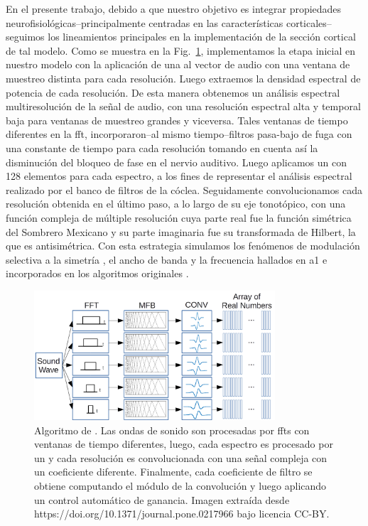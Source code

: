 {En el presente trabajo, debido a que nuestro objetivo es integrar propiedades neurofisiológicas--principalmente centradas en las características corticales--seguimos
los lineamientos principales en la implementación de la sección cortical de tal modelo.
Como se muestra en la Fig.~\ref{fig:MRSTSA}, implementamos la etapa inicial en nuestro modelo con la aplicación de una  al vector de audio
con una ventana de muestreo distinta para cada resolución.
Luego extraemos la densidad espectral de potencia de cada resolución.
De esta manera obtenemos un análisis espectral multiresolución de la señal de audio,
con una resolución espectral alta y temporal baja para ventanas de muestreo grandes y
viceversa.
Tales ventanas de tiempo diferentes en la \gls{fft},
incorporaron--al mismo tiempo--filtros pasa-bajo de fuga con una constante de tiempo para cada
resolución tomando en cuenta así la disminución del bloqueo de fase en el nervio auditivo. 
Luego aplicamos un  con 128 elementos para cada espectro,
a los fines de representar el análisis espectral realizado por el banco de filtros de la cóclea.
Seguidamente convolucionamos cada resolución obtenida en el último paso, a lo largo de su eje tonotópico,
con una función compleja de múltiple resolución cuya parte real
fue la función simétrica del Sombrero Mexicano y su parte imaginaria fue su transformada de Hilbert, la que es antisimétrica.
Con esta estrategia simulamos los fenómenos de modulación selectiva a la simetría \cite{shamma_1993}, el ancho de banda \cite{schreiner_1990}
y la frecuencia \cite{shamma_1993,heil_1992,mendelson_1985}
hallados en \gls{a1} e incorporados en los algoritmos originales \cite{wang_1995}.

\begin{figure}[h!]
    \centering
    \includegraphics[width=0.8\textwidth]{MRSTSA.png}
    \caption{Algoritmo de . Las ondas de sonido son procesadas por \glspl{fft} con ventanas de tiempo diferentes, luego, cada espectro es procesado por
	    un  y cada resolución es convolucionada con una señal compleja con un coeficiente diferente. Finalmente, cada coeficiente de filtro
	    se obtiene computando el módulo de la convolución y luego aplicando un control automático de ganancia.
	    Imagen extraída desde https://doi.org/10.1371/journal.pone.0217966 bajo licencia CC-BY.}
    \label{fig:MRSTSA}
\end{figure}

}
